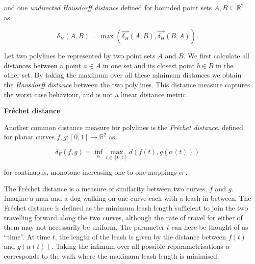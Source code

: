 and one \textit{undirected Hausdorff distance} defined for bounded point sets $A, B \subseteq \mathbb{R}^2$ as

\begin{equation}
\label{eq:udhausdorff}
    \delta_H(A,B) = \max(\overrightarrow{\delta_H}(A,B), \overrightarrow{\delta_H}(B,A)).
\end{equation}

Let two polylines be represented by two point sets $A$ and $B$. We first calculate all distances between a point $a \in A$ in one set and its closest point $b \in B$ in the other set. By taking the maximum over all these minimum distances we obtain the \textit{Hausdorff distance} between the two polylines. This distance measure captures the worst case behaviour, and is not a linear distance metric \citep{distances}.


\newpage
\textbf{Fréchet distance}

Another common distance measure for polylines is the \textit{Fréchet distance}, defined for planar curves $f, g : [0,1] \rightarrow \mathbb{R}^2$ as

\begin{equation}
\label{eq:frechet}
    \delta_F(f,g) = \inf_{\alpha}\max_{t\in [0,1]} d(f(t), g(\alpha(t))) 
\end{equation}

for continuous, monotone increasing one-to-one mappings $\alpha$ \citep{distances}.

The Fréchet distance is a measure of similarity between two curves, $f$ and $g$. Imagine a man and a dog walking on one curve each with a leash in between. The Fréchet distance is defined as the minimum leash length sufficient to join the two travelling forward along the two curves, although the rate of travel for either of them may not necessarily be uniform. The parameter $t$ can here be thought of as ``time''. At time $t$, the length of the leash is given by the distance between $f(t)$ and $g(\alpha(t))$. Taking the infimum over all possible reparametrisations $\alpha$ corresponds to the walk where the maximum leash length is minimised.

